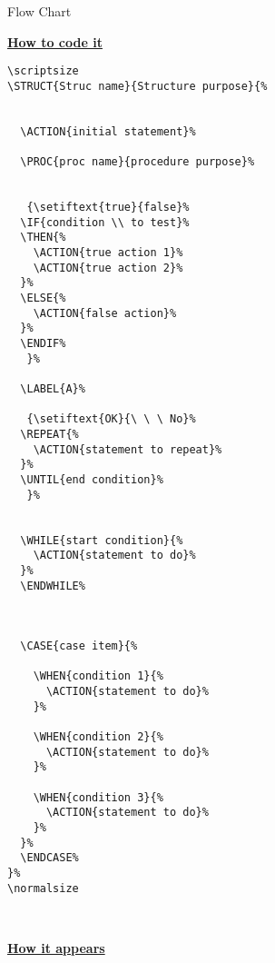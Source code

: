 \pagestyle{empty}
\setlength{\topmargin}{0cm}
\setlength{\headsep}{10pt}
\setlength{\textheight}{26cm}
\setlength{\textwidth}{16cm}
\setlength{\oddsidemargin}{2.25cm}
\setlength{\evensidemargin}{2.25cm}

\begin{center} {\Large Flow Chart} \end{center}
\begin{minipage}[t]{.48\textwidth}
\underline{\large\bf How to code it}
\begin{verbatim}
\scriptsize
\STRUCT{Struc name}{Structure purpose}{%


  \ACTION{initial statement}%

  \PROC{proc name}{procedure purpose}%


   {\setiftext{true}{false}%
  \IF{condition \\ to test}%
  \THEN{%
    \ACTION{true action 1}%
    \ACTION{true action 2}%
  }%
  \ELSE{%
    \ACTION{false action}%
  }%
  \ENDIF%
   }%

  \LABEL{A}%

   {\setiftext{OK}{\ \ \ No}%
  \REPEAT{%
    \ACTION{statement to repeat}%
  }%
  \UNTIL{end condition}%
   }%


  \WHILE{start condition}{%
    \ACTION{statement to do}%
  }%
  \ENDWHILE%



  \CASE{case item}{%

    \WHEN{condition 1}{%
      \ACTION{statement to do}%
    }%

    \WHEN{condition 2}{%
      \ACTION{statement to do}%
    }%

    \WHEN{condition 3}{%
      \ACTION{statement to do}%
    }%
  }%
  \ENDCASE%
}%
\normalsize
\end{verbatim}
\end{minipage}
~
\begin{minipage}[t]{.48\textwidth}
\underline{\large\bf How it appears}\\
\scriptsize
{}%
\normalsize
\end{minipage}


